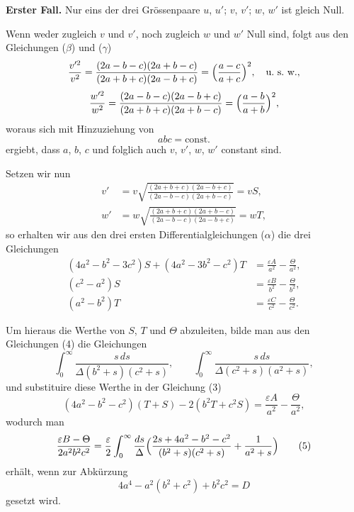 \documentclass[12pt,a4paper]{article}
\begin{document}
\begin{center}
\textbf{Erster Fall.} Nur eins der drei Gr\"ossenpaare $u$, $u'$; $v$, $v'$; $w$, $w'$ ist gleich Null.
\end{center}

Wenn weder zugleich $v$ und $v'$, noch zugleich $w$ und $w'$ Null sind, folgt aus den Gleichungen ($\beta$) und ($\gamma$)
\[
\frac{v'^{2}}{v^{2}} = \frac{(2a - b - c)(2a + b - c)}{(2a + b + c)(2a - b + c)} = \Bigl(\frac{a - c}{a + c}\Bigr)^{2},\quad\text{u.~s.~w.},
\]
\[
\frac{w'^{2}}{w^{2}} = \frac{(2a - b - c)(2a - b + c)}{(2a + b + c)(2a + b - c)} = \Bigl(\frac{a - b}{a + b}\Bigr)^{2},
\]
woraus sich mit Hinzuziehung von
\[
abc = \text{const.}
\]
ergiebt, dass $a$, $b$, $c$ und folglich auch $v$, $v'$, $w$, $w'$ constant sind.

Setzen wir nun
\begin{align*}
v' &= v\sqrt{\frac{(2a + b + c)(2a - b + c)}{(2a - b - c)(2a + b - c)}} = vS,\\
w' &= w\sqrt{\frac{(2a + b + c)(2a + b - c)}{(2a - b - c)(2a - b + c)}} = wT,\tag{2}
\end{align*}
so erhalten wir aus den drei ersten Differentialgleichungen ($\alpha$) die drei Gleichungen
\begin{align*}
(4a^{2} - b^{2} - 3c^{2})S + (4a^{2} - 3b^{2} - c^{2})T &= \frac{\varepsilon A}{a^{2}} - \frac{\Theta}{a^{2}},\\
(c^{2} - a^{2})S &= \frac{\varepsilon B}{b^{2}} - \frac{\Theta}{b^{2}},\\
(a^{2} - b^{2})T &= \frac{\varepsilon C}{c^{2}} - \frac{\Theta}{c^{2}}.\tag{3,4}
\end{align*}

Um hieraus die Werthe von $S$, $T$ und $\Theta$ abzuleiten, bilde man aus den Gleichungen (4) die Gleichungen
\[
\int_{0}^{\infty}\frac{s\,ds}{\Delta(b^{2} + s)(c^{2} + s)},\qquad \int_{0}^{\infty}\frac{s\,ds}{\Delta(c^{2} + s)(a^{2} + s)},
\]
und substituire diese Werthe in der Gleichung (3)
\[
(4a^{2} - b^{2} - c^{2})(T + S) - 2(b^{2}T + c^{2}S) = \frac{\varepsilon A}{a^{2}} - \frac{\Theta}{a^{2}},
\]
wodurch man
\begin{equation*}
\frac{\varepsilon B - \Theta}{2a^{2}b^{2}c^{2}} = \frac{\varepsilon}{2}\int_{0}^{\infty}\frac{ds}{\Delta}\Bigl(\frac{2s + 4a^{2} - b^{2} - c^{2}}{(b^{2} + s)(c^{2} + s)} + \frac{1}{a^{2} + s}\Bigr)\tag{5}
\end{equation*}
erh\"alt, wenn zur Abk\"urzung
\begin{equation*}
4a^{4} - a^{2}(b^{2} + c^{2}) + b^{2}c^{2} = D\tag{6}
\end{equation*}
gesetzt wird.
\end{document}
